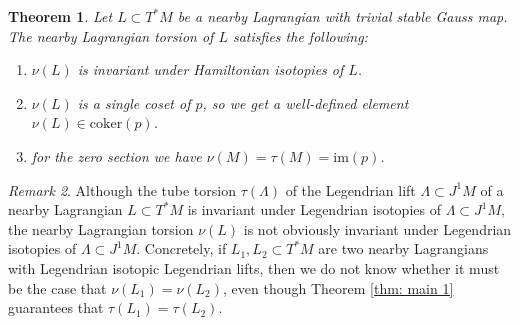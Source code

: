 \documentclass{amsart}
\newtheorem{theorem}{Theorem}[section]
\theoremstyle{definition}
\theoremstyle{remark}
\newtheorem{inductive lemma}[theorem]{Inductive Lemma}
\newtheorem{remark}[theorem]{Remark}
\begin{document}
 
  \begin{theorem}\label{thm: main 2} Let  $L \subset T^*M$ be a nearby Lagrangian with trivial stable Gauss map. The nearby Lagrangian torsion of $L$ satisfies the following:
  \begin{enumerate}
   \item $\nu(L)$ is invariant under Hamiltonian isotopies of $L$. 
  \item $\nu(L)$ is a single coset of $p$, so we get a well-defined element $\nu(L)  \in \text{coker}(p)$.
  \item for the zero section we have $\nu(M)=\tau(M)=\text{im}(p)$.
  \end{enumerate}
 \end{theorem}
 
 \begin{remark} Although the tube torsion $\tau(\Lambda) $ of the Legendrian lift $\Lambda \subset J^1M$ of a nearby Lagrangian $L \subset T^*M$ is invariant under Legendrian isotopies of $\Lambda \subset J^1M$, the nearby Lagrangian torsion $\nu(L)$ is not obviously invariant under Legendrian isotopies of $\Lambda \subset J^1M$. Concretely, if $L_1, L_2 \subset T^*M$ are two nearby Lagrangians with Legendrian isotopic Legendrian lifts, then we do not know whether it must be the case that $\nu(L_1) = \nu(L_2)$, even though Theorem \ref{thm: main 1} guarantees that $\tau(L_1)=\tau(L_2)$. 
 \end{remark}
 
 
\end{document}
